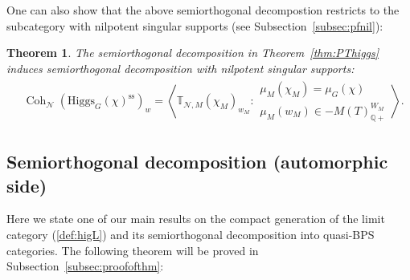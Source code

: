 \documentclass [11pt,oneside,a4paper,mathscr]{amsart}
\newtheorem{thm}{Theorem}[section]
\theoremstyle{definition}
\newcommand{\Coh}{\operatorname{Coh}}
\newcommand{\Hig}{\mathrm{Higgs}}
\begin{document}
One can also show that the above semiorthogonal decompostion restricts to the subcategory with nilpotent 
singular supports (see Subsection~\ref{subsec:pfnil}): 
\begin{thm}\label{thm:nilp0}
The semiorthogonal decomposition in Theorem~\ref{thm:PThiggs} induces 
semiorthogonal decomposition with nilpotent singular supports: 
\begin{align*}
    &\Coh_{\mathcal{N}}(\Hig_G(\chi)^{\mathrm{ss}})_w=
    \left\langle \mathbb{T}_{\mathcal{N}, M}(\chi_{M})_{w_{M}} : \begin{array}{ll}\mu_M(\chi_M)=\mu_G(\chi) \\
     \mu_M(w_{M}) \in 
   -M(T)_{\mathbb{Q}+}^{W_{M}} \end{array}
    \right\rangle.
\end{align*}
\end{thm}

\subsection{Semiorthogonal decomposition (automorphic side)}\label{subsec:SOD}
Here we state one of our main results on the compact generation of the limit category (\ref{def:higL}) 
and its semiorthogonal decomposition into quasi-BPS categories. 
The following theorem will be proved in Subsection~\ref{subsec:proofofthm}:
\end{document}
